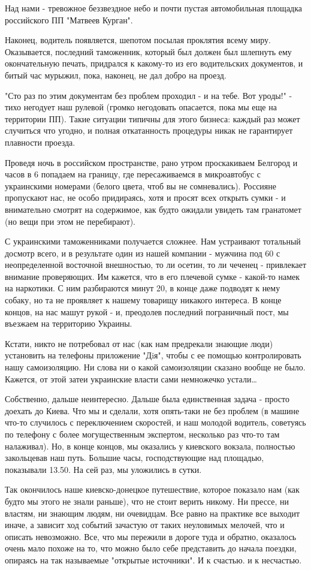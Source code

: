 Над нами - тревожное беззвездное небо и почти пустая автомобильная площадка
российского ПП "Матвеев Курган".

Наконец, водитель появляется, шепотом посылая проклятия всему миру.
Оказывается, последний таможенник, который был должен был шлепнуть ему
окончательную печать, придрался к какому-то из его водительских документов, и
битый час мурыжил, пока, наконец, не дал добро на проезд.

"Сто раз по этим документам без проблем проходил - и на тебе. Вот уроды!" -
тихо негодует наш рулевой (громко негодовать опасается, пока мы еще на
территории ПП). Такие ситуации типичны для этого бизнеса: каждый раз может
случиться что угодно, и полная откатанность процедуры никак не гарантирует
плавности проезда.

Проведя ночь в российском пространстве, рано утром проскакиваем Белгород и
часов в 6 попадаем на границу, где пересаживаемся в микроавтобус с украинскими
номерами (белого цвета, чтоб вы не сомневались). Россияне пропускают нас, не
особо придираясь, хотя и просят всех открыть сумки - и внимательно смотрят на
содержимое, как будто ожидали увидеть там гранатомет (но вещи при этом не
перебирают).

С украинскими таможенниками получается сложнее. Нам устраивают тотальный
досмотр всего, и в результате один из нашей компании - мужчина под 60 с
неопределенной восточной внешностью, то ли осетин, то ли чеченец - привлекает
внимание проверяющих. Им кажется, что в его плечевой сумке - какой-то намек на
наркотики. С ним разбираются минут 20, в конце даже подводят к нему собаку, но
та не проявляет к нашему товарищу никакого интереса. В конце концов, на нас
машут рукой - и, преодолев последний пограничный пост, мы въезжаем на
территорию Украины.

Кстати, никто не потребовал от нас (как нам предрекали знающие люди) установить
на телефоны приложение "Дiя", чтобы с ее помощью контролировать нашу
самоизоляцию. Ни слова ни о какой самоизоляции сказано вообще не было. Кажется,
от этой затеи украинские власти сами немножечко устали…

Собственно, дальше неинтересно. Дальше была единственная задача - просто
доехать до Киева. Что мы и сделали, хотя опять-таки не без проблем (в машине
что-то случилось с переключением скоростей, и наш молодой водитель, советуясь
по телефону с более могущественным экспертом, несколько раз что-то там
налаживал). Но, в конце концов, мы оказались у киевского вокзала, полностью
закольцевав наш путь. Большие часы, господствующие над площадью, показывали
13.50. На сей раз, мы уложились в сутки.

Так окончилось наше киевско-донецкое путешествие, которое показало нам (как
будто мы этого не знали раньше), что не стоит верить никому. Ни прессе, ни
властям, ни знающим людям, ни очевидцам. Все равно на практике все выходит
иначе, а зависит ход событий зачастую от таких неуловимых мелочей, что и
описать невозможно. Все, что мы пережили в дороге туда и обратно, оказалось
очень мало похоже на то, что можно было себе представить до начала поездки,
опираясь на так называемые "открытые источники". И к счастью. и к несчастью.


